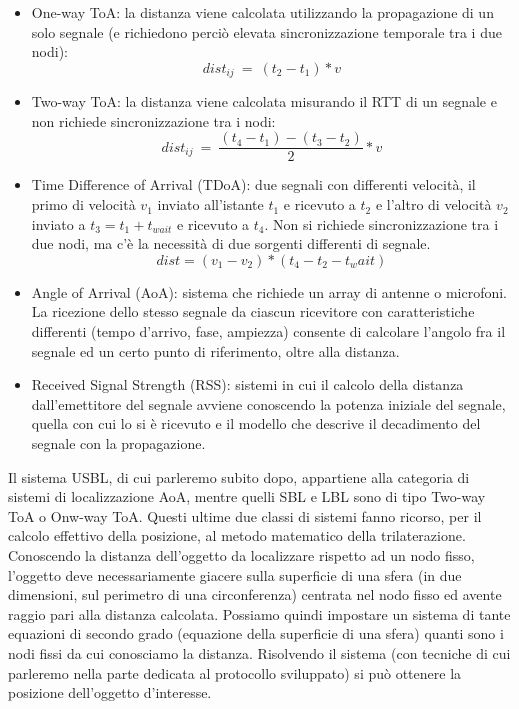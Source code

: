 \documentclass[Lau,binding=0.6cm]{sapthesis}
\begin{document}
\begin{itemize}
    \item One-way ToA: la distanza viene calcolata utilizzando la propagazione di un solo segnale (e richiedono perciò elevata sincronizzazione temporale tra i due nodi):
    \[dist_{ij}\ =\ (t_2-t_1)*v\]
    \item Two-way ToA: la distanza viene calcolata misurando il RTT di un segnale e non richiede sincronizzazione tra i nodi:
    \[dist_{ij}\ =\ \frac{(t_4-t_1)-(t_3-t_2)}{2}*v\]
    \item Time Difference of Arrival (TDoA): due segnali con differenti velocità, il primo di velocità $v_1$ inviato all'istante $t_1$ e ricevuto a $t_2$ e l'altro di velocità $v_2$ inviato a $t_3 = t_1 + t_{wait}$ e ricevuto a $t_4$. Non si richiede sincronizzazione tra i due nodi, ma c'è la necessità di due sorgenti differenti di segnale.
    \[dist = (v_1 - v_2)*(t_4 - t_2 - t_wait)\]
    \item Angle of Arrival (AoA): sistema che richiede un array di antenne o microfoni. La ricezione dello stesso segnale da ciascun ricevitore con caratteristiche differenti (tempo d'arrivo, fase, ampiezza) consente di calcolare l'angolo fra il segnale ed un certo punto di riferimento, oltre alla distanza.
    \item Received Signal Strength (RSS): sistemi in cui il calcolo della distanza dall'emettitore del segnale avviene conoscendo la potenza iniziale del segnale, quella con cui lo si è ricevuto e il modello che descrive il decadimento del segnale con la propagazione.
\end{itemize}
Il sistema USBL, di cui parleremo subito dopo, appartiene alla categoria di sistemi di localizzazione AoA, mentre quelli SBL e LBL sono di tipo Two-way ToA o Onw-way ToA.
Questi ultime due classi di sistemi fanno ricorso, per il calcolo effettivo della posizione, al metodo matematico della trilaterazione.
Conoscendo la distanza dell'oggetto da localizzare rispetto ad un nodo fisso, l'oggetto deve necessariamente giacere sulla superficie di una sfera (in due dimensioni, sul perimetro di una circonferenza) centrata nel nodo fisso ed avente raggio pari alla distanza calcolata. Possiamo quindi impostare un sistema di tante equazioni di secondo grado (equazione della superficie di una sfera) quanti sono i nodi fissi da cui conosciamo la distanza. Risolvendo il sistema (con tecniche di cui parleremo nella parte dedicata al protocollo sviluppato) si può ottenere la posizione dell'oggetto d'interesse.
\end{document}
